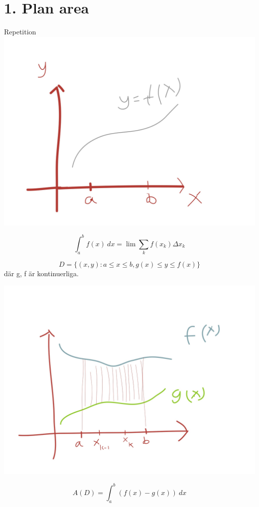\documentclass{article}
\begin{document}
\section{1. Plan area}

Repetition
\includegraphics[scale=0.15]{img/img1.jpg}

$$ \int_a^b{f(x)\ dx} =\lim \sum_k{f(x_k) \Delta x_k}  $$

$$ D=\{(x,y) : a \le x \le b, g(x) \le y \le f(x)\} $$ där g, f är kontinuerliga.

\includegraphics[scale=0.15]{img/img2.jpg}

$$ A(D) = \int_a^b{(f(x) - g(x))\ dx} $$
\end{document}
